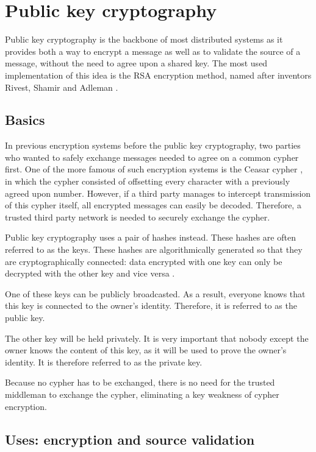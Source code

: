 \section{Public key cryptography}

Public key cryptography is the backbone of most distributed systems as it provides both a way to encrypt a message as well as to validate the source of a message, without the need to agree upon a shared key. The most used implementation of this idea is the RSA encryption method, named after inventors Rivest, Shamir and Adleman \cite{rsa-patent}. 

\subsection{Basics}

In previous encryption systems before the public key cryptography, two parties who wanted to safely exchange messages needed to agree on a common cypher first. One of the more famous of such encryption systems is the Ceasar cypher \cite{ceasar-cypher}, in which the cypher consisted of offsetting every character with a previously agreed upon number. However, if a third party manages to intercept transmission of this cypher itself, all encrypted messages can easily be decoded. Therefore, a trusted third party network is needed to securely exchange the cypher.

Public key cryptography uses a pair of hashes instead. These hashes are often referred to as the keys. These hashes are algorithmically generated so that they are cryptographically connected: data encrypted with one key can only be decrypted with the other key and vice versa \cite{rsa-paper-explanation}.

One of these keys can be publicly broadcasted. As a result, everyone knows that this key is connected to the owner's identity. Therefore, it is referred to as the public key.

The other key will be held privately. It is very important that nobody except the owner knows the content of this key, as it will be used to prove the owner's identity. It is therefore referred to as the private key.

Because no cypher has to be exchanged, there is no need for the trusted middleman to exchange the cypher, eliminating a key weakness of cypher encryption.

\subsection{Uses: encryption and source validation}

